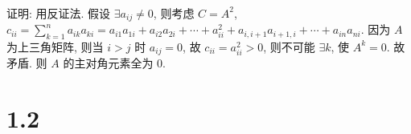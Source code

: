 	 \paragraph{} %
		 证明: 用反证法. 假设 $\exists a_{ij} \neq 0$, 则考虑 $C = A^2$,
		 $c_{ii} = \sum_{k=1}^{n} a_{ik} a_{ki} = a_{i1} a_{1i} + a_{i2} a_{2i} + \cdots + a_{ii}^2 + a_{i,i+1} a_{i+1,i} + \cdots + a_{in} a_{ni}$.
		 因为 $A$ 为上三角矩阵, 则当 $i > j$ 时 $a_{ij} = 0$,
		 故 $c_{ii} = a_{ii}^2 > 0$,
		 则不可能 $\exists k$, 使 $A^k = 0$.
		 故矛盾. 则 $A$ 的主对角元素全为 $0$.

\section{1.2}


 \subsection{} %


